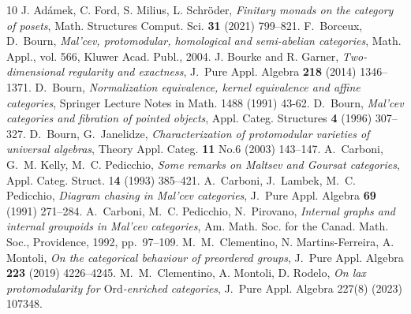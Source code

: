 \documentclass[11pt]{amsart}
\theoremstyle{plain}
\theoremstyle{definition}
\theoremstyle{remark}
\newcommand{\todo}[1]{{\color{red} [#1]}}
\begin{document}
\begin{thebibliography}{10}
 J. Ad\'{a}mek, C. Ford, S. Milius, L. Schr\"{o}der, \emph{Finitary monads on the category of posets}, Math. Structures Comput. Sci. \textbf{31} (2021) 799--821.
 F.~Borceux, D.~Bourn, \emph{Mal'cev, protomodular, homological and semi-abelian categories}, Math. Appl., vol. 566, Kluwer Acad. Publ., 2004.
 J. Bourke and R. Garner, \emph{Two-dimensional regularity and exactness}, J.~Pure Appl. Algebra \textbf{218} (2014) 1346--1371.
 D.~Bourn, \emph{Normalization equivalence, kernel equivalence and affine categories}, Springer Lecture Notes in Math. 1488 (1991) 43-62.
 D.~Bourn, \emph{Mal'cev categories and fibration of pointed objects}, Appl. Categ. Structures \textbf{4} (1996) 307--327.
 D.~Bourn, G.~Janelidze, \emph{Characterization of protomodular varieties of universal algebras}, Theory Appl. Categ. \textbf{11} No.6 (2003) 143--147.
 A.~Carboni, G.~M. Kelly, M.~C. Pedicchio, \emph{Some remarks on {M}altsev and {G}oursat categories}, Appl. Categ. Struct. 1\textbf{4} (1993) 385--421.
 A.~Carboni, J.~Lambek, M.~C. Pedicchio, \emph{Diagram chasing in {M}al'cev categories}, J.~Pure Appl. Algebra \textbf{69} (1991) 271--284.
 A.~Carboni, M.~C. Pedicchio,  N.~Pirovano, \emph{Internal graphs and internal groupoids in {M}al'cev categories}, Am. Math. Soc. for the Canad. Math. Soc., Providence, 1992, pp.~97--109.
 M.~M.~Clementino, N. Martins-Ferreira, A. Montoli, \emph{On the categorical behaviour of preordered groups}, {J.~Pure} Appl. Algebra \textbf{223} (2019) 4226--4245.
  M.~M.~Clementino, A. Montoli, D. Rodelo, \emph{On lax protomodularity for $\mathrm{Ord}$-enriched categories}, {J.~Pure} Appl. Algebra 227(8) (2023) 107348.

\end{thebibliography}
\end{document}
